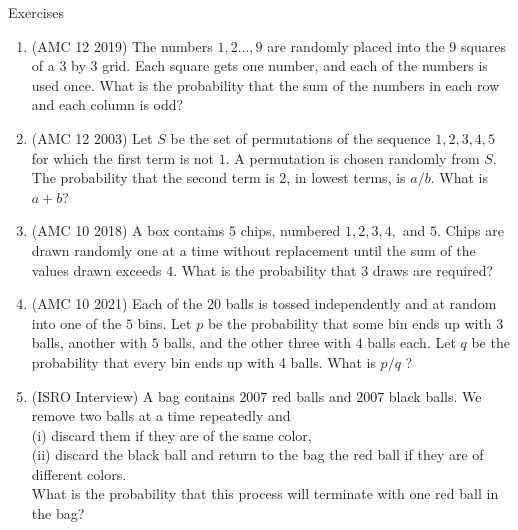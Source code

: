 \begin{xcb}{Exercises}
\begin{enumerate}
\begin{hint}
\end{hint}
\item (AMC 12 2019)  The numbers $1,2 \dots ,9$ are randomly placed into the 9 squares of a 3 by 3 grid. Each square gets one number, and each of the numbers is used once. What is the probability that the sum of the numbers in each row and each column is odd?\\
\begin{hint}
\end{hint}
\item (AMC 12 2003)  Let $S$ be the set of permutations of the sequence $1, 2, 3, 4, 5$ for which the first term is not $1$. A permutation is chosen randomly from $S$. The probability that the second term is $2$, in lowest terms, is $a/b$. What is $a + b$?
\item (AMC 10 2018)  A box contains $5$ chips, numbered $1, 2, 3, 4,$ and $5$. Chips are drawn randomly one at a time without replacement until the sum of the values drawn exceeds $4$. What is the probability that $3$ draws are required?
\begin{hint}
\end{hint}
\item (AMC 10 2021)  Each of the $20$ balls is tossed independently and at random into one of the $5$ bins. Let $p$ be the probability that some bin ends up with $3$ balls, another with $5$ balls, and the other three with $4$ balls each. Let $q$ be the probability that every bin ends up with 4 balls. What is $p/q$ ?
\begin{hint}
\end{hint}
\item (ISRO Interview)  A bag contains $2007$ red balls and $2007$ black balls. We remove two balls
at a time repeatedly and\\
(i) discard them if they are of the same color,\\
(ii) discard the black ball and return to the bag the red ball if they are of different
colors.\\
What is the probability that this process will terminate with one red ball in the bag?

\end{enumerate}
\end{xcb}
